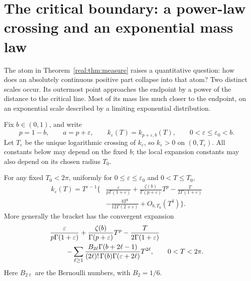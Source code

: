 \section{The critical boundary: a power-law crossing and an exponential mass law}
\label{real:sec:boundary}

The atom in Theorem~\ref{real:thm:measure} raises a quantitative
question: how does an absolutely continuous positive part collapse into
that atom? Two distinct scales occur. Its outermost point approaches the
endpoint by a power of the distance to the critical line. Most of its
mass lies much closer to the endpoint, on an exponential scale described
by a limiting exponential distribution.

Fix $b\in(0,1)$, and write
\begin{equation}\label{real:eq:boundary-parameters}
 p=1-b,\qquad a=p+\varepsilon,\qquad
 k_\varepsilon(T)=k_{p+\varepsilon,b}(T),\qquad
 0<\varepsilon\leq\varepsilon_0<b.
\end{equation}
Let $T_\varepsilon$ be the unique logarithmic crossing of
$k_\varepsilon$, so $k_\varepsilon>0$ on $(0,T_\varepsilon)$.
All constants below may depend on the fixed $b$; the local expansion
constants may also depend on its chosen radius $T_0$.

\begin{lemma}
\label{real:lem:boundary-expansion}
For any fixed $T_0<2\pi$, uniformly for
$0\leq\varepsilon\leq\varepsilon_0$ and $0<T\leq T_0$,
\begin{equation}\label{real:eq:boundary-expansion}
\begin{split}
 k_\varepsilon(T)=T^{\varepsilon-1}\biggl\{
 &\frac{\varepsilon}{p\Gamma(1+\varepsilon)}
 +\frac{\zeta(b)}{\Gamma(p+\varepsilon)}T^p
 -\frac{T}{2\Gamma(1+\varepsilon)}\\
 &-\frac{bT^2}{12\Gamma(2+\varepsilon)}+O_{b,T_0}(T^4)
 \biggr\}.
\end{split}
\end{equation}
More generally the bracket has the convergent expansion
\begin{equation}\label{real:eq:boundary-series}
\begin{split}
 &\frac{\varepsilon}{p\Gamma(1+\varepsilon)}
 +\frac{\zeta(b)}{\Gamma(p+\varepsilon)}T^p
 -\frac{T}{2\Gamma(1+\varepsilon)}\\
 &\hspace{8mm}
 -\sum_{\ell\geq1}\frac{B_{2\ell}\Gamma(b+2\ell-1)}
 {(2\ell)!\,\Gamma(b)\Gamma(\varepsilon+2\ell)}T^{2\ell},
 \qquad 0<T<2\pi.
\end{split}
\end{equation}
Here $B_{2\ell}$ are the Bernoulli numbers, with $B_2=1/6$.
\end{lemma}

